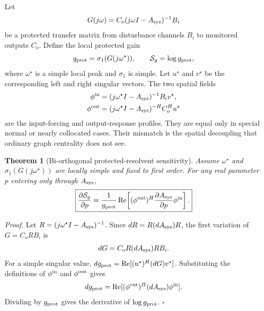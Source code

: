 \documentclass[journal]{IEEEtran}
\newtheorem{theorem}{Theorem}
\newcommand{\Real}{\operatorname{Re}}
\begin{document}
Let
\begin{equation}
G(j\omega)=C_o(j\omega I-A_{\rm sys})^{-1}B_i
\label{eq:protectedresolvent}
\end{equation}
be a protected transfer matrix from disturbance channels $B_i$ to monitored outputs $C_o$. Define the local protected gain
\begin{equation}
g_{\rm prot}=\sigma_1(G(j\omega^\star)),
\qquad
\mathcal{S}_g=\log g_{\rm prot},
\label{eq:protectedgain}
\end{equation}
where $\omega^\star$ is a simple local peak and $\sigma_1$ is simple. Let $u^\star$ and $v^\star$ be the corresponding left and right singular vectors. The two spatial fields
\begin{align}
\phi^{\rm in}
&=(j\omega^\star I-A_{\rm sys})^{-1}B_i v^\star,
\label{eq:phiin}\\
\phi^{\rm out}
&=(j\omega^\star I-A_{\rm sys})^{-H}C_o^H u^\star
\label{eq:phiout}
\end{align}
are the input-forcing and output-response profiles. They are equal only in special normal or nearly collocated cases. Their mismatch is the spatial decoupling that ordinary graph centrality does not see.

\begin{theorem}[Bi-orthogonal protected-resolvent sensitivity]
\label{thm:protectedresolvent}
Assume $\omega^\star$ and $\sigma_1(G(j\omega^\star))$ are locally simple and fixed to first order. For any real parameter $p$ entering only through $A_{\rm sys}$,
\begin{equation}
\boxed{
\frac{\partial \mathcal{S}_g}{\partial p}
=
\frac{1}{g_{\rm prot}}
\Real\!\left[
(\phi^{\rm out})^H
\frac{\partial A_{\rm sys}}{\partial p}
\phi^{\rm in}
\right].}
\label{eq:protectedsens}
\end{equation}
\end{theorem}
\noindent\emph{Proof.}
Let $R=(j\omega^\star I-A_{\rm sys})^{-1}$. Since $dR=R(dA_{\rm sys})R$, the first variation of $G=C_oRB_i$ is
\begin{equation}
dG=C_oR(dA_{\rm sys})RB_i .
\end{equation}
For a simple singular value, $dg_{\rm prot}=\Real[(u^\star)^H(dG)v^\star]$. Substituting the definitions of $\phi^{\rm in}$ and $\phi^{\rm out}$ gives
\begin{equation}
dg_{\rm prot}
=
\Real[(\phi^{\rm out})^H(dA_{\rm sys})\phi^{\rm in}].
\end{equation}
Dividing by $g_{\rm prot}$ gives the derivative of $\log g_{\rm prot}$. \hfill$\square$
\end{document}
